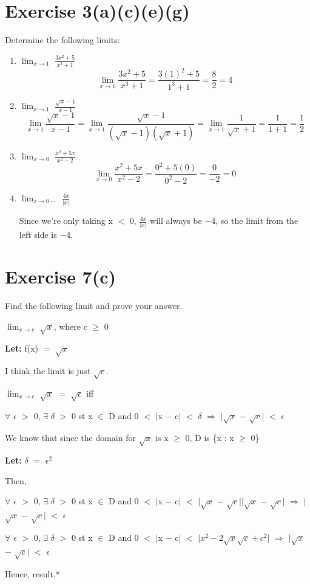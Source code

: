 \documentclass{article}
\newcommand{\mt}[1]{\ensuremath{#1}}
\newcommand\bsc[2][\DefaultOpt]{%
  \def\DefaultOpt{#2}%
  \section[#1]{#2}%
}
\newcommand{\balist}{\begin{enumerate}[label=\alph*.]}
\newcommand{\elist}{\end{enumerate}}
\newcommand{\lt}[1]{\textbf{Let: } #1}
\newcommand{\ep}{\mt{\epsilon} }         %
\newcommand{\fa}{\mt{\forall} }          %
\newcommand{\dta}{\mt{\delta} }
\newcommand{\mem}{\mt{\in} }
\newcommand{\exs}{\mt{\exists} }
\newcommand{\rar}{ \mt{\Rightarrow} }     %
\newcommand{\av}[1]{\mt{|}#1\mt{|}}  %
\newcommand{\bk}[1]{\{#1\}}
\newcommand{\ms}{\mt{-} }
\newcommand{\ls}{\mt{<} }
\newcommand{\gr}{\mt{>} }
\newcommand{\gre}{\mt{\geq} }
\newcommand{\eql}{\mt{=} }
\newcommand{\frc}[2]{\mt{\frac{#1}{#2}}}
\newcommand{\limt}[2]{\mt{\displaystyle{\lim_{#1 \to #2}}}}
\newcommand{\eqn}[1]{\[#1\]}
\begin{document}
\newpage

\bsc{Exercise 3(a)(c)(e)(g)}{

Determine the following limits:

\balist
\item \limt{x}{1} \frc{3x^2 + 5}{x^3 + 1}
	\eqn{\limt{x}{1} \frc{3x^2 + 5}{x^3 + 1} = \frac{3(1)^2 + 5}{1^3 + 1} = \frac{8}{2} = 4}
\item \limt{x}{1} \frc{\sqrt{x} - 1}{x - 1}
	\eqn{\limt{x}{1} \frc{\sqrt{x} - 1}{x - 1} = \limt{x}{1} \frc{\sqrt{x} - 1}{(\sqrt{x} - 1)(\sqrt{x} + 1)} = \limt{x}{1} \frac{1}{\sqrt{x} + 1} = \frac{1}{1 + 1} = \frac{1}{2}}
\item \limt{x}{0} \frc{x^2 + 5x}{x^2 - 2}
	\eqn{\limt{x}{0} \frc{x^2 + 5x}{x^2 - 2} = \frc{0^2 + 5(0)}{0^2 - 2} = \frac{0}{-2} = 0}
	
\item \limt{x}{0-} \frc{4x}{\av{x}}
	
	Since we're only taking x \ls 0, \frc{4x}{|x|} will always be $-$4, so the limit from the left side is $-$4.
\elist
}

\bsc{Exercise 7(c)}{

Find the following limit and prove your answer.

\limt{x}{c} $\sqrt{x}$, where c \gre 0

\lt{f(x) \eql $\sqrt{x}$}

I think the limit is just $\sqrt{c}$.

\limt{x}{c} $\sqrt{x}$ \eql $\sqrt{c}$ iff

\fa \ep \gr 0, \exs \dta \gr 0 st x \mem D and 0 \ls \av{x \ms c} \ls \dta \rar \av{$\sqrt{x}$ \ms $\sqrt{c}$} \ls \ep

We know that since the domain for $\sqrt{x}$ is x \gre 0, D is \bk{x : x \gre 0}

\lt{\dta \eql $\epsilon^2$}

Then,

\fa \ep \gr 0, \exs \dta \gr 0 st x \mem D and 0 \ls \av{x \ms c} \ls \av{$\sqrt{x}$ \ms $\sqrt{c}$}\av{$\sqrt{x}$ \ms $\sqrt{c}$} \rar \av{$\sqrt{x}$ \ms $\sqrt{c}$} \ls \ep

\fa \ep \gr 0, \exs \dta \gr 0 st x \mem D and 0 \ls \av{x \ms c} \ls \av{$x^2 - 2\sqrt{x}\sqrt{c} + c^2$} \rar \av{$\sqrt{x}$ \ms $\sqrt{c}$} \ls \ep

Hence, result.*

}

\newpage
\end{document}
